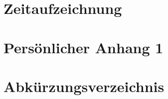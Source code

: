 \renewcommand\appendixname{Anhang}
\renewcommand\appendixpagename{Anhang}
\renewcommand\appendixtocname{Anhang}

\lohead{}

\appendix
\begingroup
\makeatletter
\let\ps@plain\ps@empty
\appendixpage
\makeatother
\endgroup

\chapter{Zeitaufzeichnung}
\chapter{Persönlicher Anhang 1}
\listoffigures
\listoftables
\lstlistoflistings



\chapter{Abkürzungsverzeichnis}
\begin{acronym}
\end{acronym}
